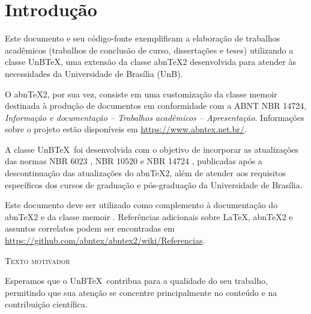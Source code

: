 \chapter{Introdução}
\label{cap:intr}

Este documento e seu código-fonte exemplificam a elaboração de trabalhos acadêmicos (trabalhos de conclusão de curso, dissertações e teses) utilizando a classe UnB\TeX, uma extensão da classe abn\TeX2 \cite{abntex2classe} desenvolvida para atender às necessidades da Universidade de Brasília (UnB).


O abn\TeX2, por sua vez, consiste em uma customização da classe \textsf{memoir} destinada à produção de documentos em conformidade com a ABNT NBR 14724, \emph{Informação e documentação -- Trabalhos acadêmicos -- Apresentação}. Informações sobre o projeto estão disponíveis em \url{https://www.abntex.net.br/}.


A classe UnB\TeX\ foi desenvolvida com o objetivo de incorporar as atualizações das normas NBR 6023 \cite{NBR6023:2025}, NBR 10520 \cite{NBR10520:2023} e NBR 14724 \cite{NBR14724:2024}, publicadas após a descontinuação das atualizações do abn\TeX2, além de atender aos requisitos específicos dos cursos de graduação e pós-graduação da Universidade de Brasília.

Este documento deve ser utilizado como complemento à documentação do abn\TeX2 \cite{abntex2classe} e da classe \textsf{memoir} \cite{memoir}. Referências adicionais sobre \LaTeX, abn\TeX2 e assuntos correlatos podem ser encontradas em \url{https://github.com/abntex/abntex2/wiki/Referencias}.

\begin{mdframed}[style=plainSty,innertopmargin=8pt] %
{\center \textsc{Texto motivador} \par}
\noindent Esperamos que o UnB\TeX\ contribua para a qualidade do seu trabalho, permitindo que sua atenção se concentre principalmente no conteúdo e na contribuição científica.
\end{mdframed}